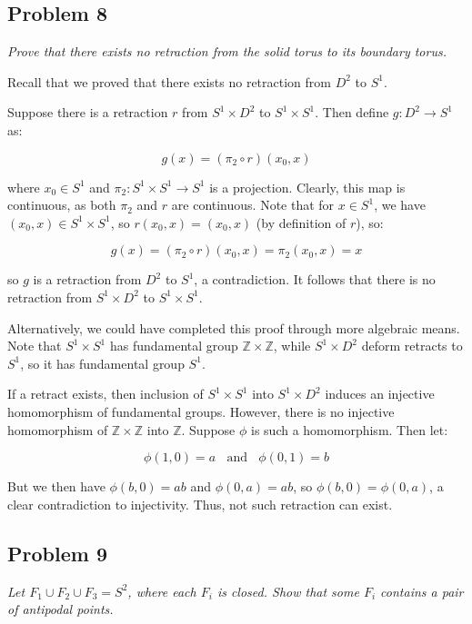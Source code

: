 \documentclass[10pt, oneside]{amsart}
\begin{document}
    \subsection{Problem 8} \textit{Prove that there exists no retraction from the solid torus to its boundary torus.}
    \newline

    Recall that we proved that there exists no retraction from $D^2$ to $S^1$.
    \newline

    Suppose there is a retraction $r$ from $S^{1} \times D^2$ to $S^1 \times S^1$. Then define $g : D^2 \rightarrow S^1$ as:

    $$g(x) = (\pi_2 \circ r)(x_0, x)$$

    where $x_0 \in S^{1}$ and $\pi_2 : S^{1} \times S^{1} \rightarrow S^{1}$ is a projection. Clearly, this map is continuous, as both $\pi_2$ and $r$ are continuous. Note that for
    $x \in S^{1}$, we have $(x_0, x) \in S^{1} \times S^{1}$, so $r(x_0, x) = (x_0, x)$ (by definition of $r$), so:

    $$g(x) = (\pi_2 \circ r)(x_0, x) = \pi_2(x_0, x) = x$$

    so $g$ is a retraction from $D^2$ to $S^1$, a contradiction. It follows that there is no retraction from $S^{1} \times D^2$ to $S^1 \times S^1$.
    \newline

    Alternatively, we could have completed this proof through more algebraic means. Note that $S^{1} \times S^{1}$ has fundamental group $\mathbb{Z} \times \mathbb{Z}$, while
    $S^{1} \times D^{2}$ deform retracts to $S^{1}$, so it has fundamental group $S^{1}$.
    \newline

    If a retract exists, then inclusion of $S^{1} \times S^{1}$ into $S^{1} \times D^{2}$ induces an injective homomorphism of fundamental groups. However, there is
    no injective homomorphism of $\mathbb{Z} \times \mathbb{Z}$ into $\mathbb{Z}$. Suppose $\phi$ is such a homomorphism. Then let:

    $$\phi(1, 0) = a \ \ \ \ \text{and} \ \ \ \ \phi(0, 1) = b$$

    But we then have $\phi(b, 0) = ab$ and $\phi(0, a) = ab$, so $\phi(b, 0) = \phi(0, a)$, a clear contradiction to injectivity. Thus, not such retraction can exist.

    \hrulefill

    \subsection{Problem 9} \textit{Let $F_1 \cup F_2 \cup F_3 = S^{2}$, where each $F_i$ is closed. Show that some $F_i$ contains a pair of antipodal points.}
    \newline
\end{document}

